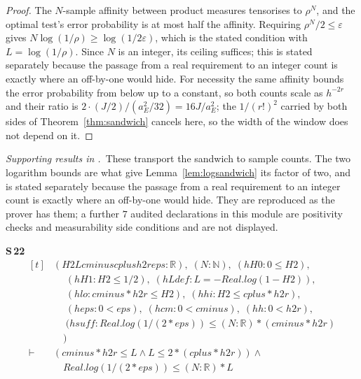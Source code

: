 \begin{proof}
The $N$-sample affinity between product measures tensorises to $\rho^{N}$, and the optimal
test's error probability is at most half the affinity. Requiring $\rho^{N}/2\le\varepsilon$
gives $N\log(1/\rho)\ge\log(1/2\varepsilon)$, which is the stated condition with
$L=\log(1/\rho)$. Since $N$ is an integer, its ceiling suffices; this is stated separately
because the passage from a real requirement to an integer count is exactly where an
off-by-one would hide. For necessity the same affinity bounds the error probability from
below up to a constant, so both counts scale as $h^{-2r}$ and their ratio is
$2\cdot(J/2)/(a_{E}^{2}/32)=16J/a_{E}^{2}$; the $1/(r!)^{2}$ carried by both sides of
Theorem~\ref{thm:sandwich} cancels here, so the width of the window does not depend on it.
\end{proof}


\noindent\emph{Supporting results in .}~These transport the sandwich to sample counts. The two logarithm bounds are what give Lemma~\ref{lem:logsandwich} its factor of two, and  is stated separately because the passage from a real requirement to an integer count is exactly where an off-by-one would hide. They are reproduced as the prover has them; a further $7$ audited declarations in this module are positivity checks and measurability side conditions and are not displayed.

\noindent\textbf{S\,22}\quad{}
{\footnotesize\[ \begin{aligned}[t]
&(\mathit{H2} \mathit{L} \mathit{cminus} \mathit{cplus} \mathit{h2r} \mathit{eps} : \mathbb{R} ),\; (\mathit{N} : \mathbb{N} ),\; (\mathit{hH0} : 0 \leq \mathit{H2}),\\
&\quad \; (\mathit{hH1} : \mathit{H2} \leq 1/2),\; (\mathit{hLdef} : \mathit{L} = -\mathit{Real}.\mathit{log} (1 - \mathit{H2})),\\
&\quad \; (\mathit{hlo} : \mathit{cminus} * \mathit{h2r} \leq \mathit{H2}),\; (\mathit{hhi} : \mathit{H2} \leq \mathit{cplus} * \mathit{h2r}),\\
&\quad \; (\mathit{heps} : 0 < \mathit{eps}),\; (\mathit{hcm} : 0 < \mathit{cminus}),\; (\mathit{hh} : 0 < \mathit{h2r}),\\
&\quad \; (\mathit{hsuff} : \mathit{Real}.\mathit{log} (1 / (2 * \mathit{eps})) \leq (\mathit{N} : \mathbb{R} ) * (\mathit{cminus} * \mathit{h2r})\\
&\quad )\\
\vdash\;&(\mathit{cminus} * \mathit{h2r} \leq \mathit{L} \wedge \mathit{L} \leq 2 * (\mathit{cplus} * \mathit{h2r})) \wedge\\
&\quad \mathit{Real}.\mathit{log} (1 / (2 * \mathit{eps})) \leq (\mathit{N} : \mathbb{R} ) * \mathit{L}
\end{aligned} \]}


